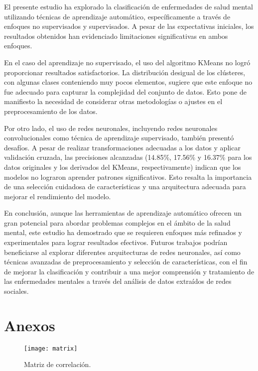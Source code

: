 \documentclass[
10pt, %
a4paper, %
oneside, %
headinclude,footinclude, %
BCOR5mm, %
]{scrartcl}
\begin{document}
El presente estudio ha explorado la clasificación de enfermedades de salud mental utilizando técnicas de aprendizaje automático, específicamente a través de enfoques no supervisados y supervisados. 
A pesar de las expectativas iniciales, los resultados obtenidos han evidenciado limitaciones significativas en ambos enfoques.

En el caso del aprendizaje no supervisado, el uso del algoritmo KMeans no logró proporcionar resultados satisfactorios. La distribución desigual de los clústeres, con algunas 
clases conteniendo muy pocos elementos, sugiere que este enfoque no fue adecuado para capturar la complejidad del conjunto de datos. Esto pone de manifiesto la necesidad de considerar otras 
metodologías o ajustes en el preprocesamiento de los datos.

Por otro lado, el uso de redes neuronales, incluyendo redes neuronales convolucionales como técnica de aprendizaje supervisado, también presentó desafíos. 
A pesar de realizar transformaciones adecuadas a los datos y aplicar validación cruzada, las precisiones alcanzadas (14.85\%, 17.56\% y 16.37\% para los datos originales y 
los derivados del KMeans, respectivamente) indican que los modelos no lograron aprender patrones significativos. Esto resalta la importancia de una selección cuidadosa de características y una 
arquitectura adecuada para mejorar el rendimiento del modelo.

En conclusión, aunque las herramientas de aprendizaje automático ofrecen un gran potencial para abordar problemas complejos en el ámbito de la salud mental, este estudio ha demostrado que se requieren enfoques más refinados 
y experimentales para lograr resultados efectivos. Futuros trabajos podrían beneficiarse al explorar diferentes arquitecturas de redes neuronales, así como técnicas avanzadas de preprocesamiento y selección de características, 
con el fin de mejorar la clasificación y contribuir a una mejor comprensión y tratamiento de las enfermedades mentales a través del análisis de datos extraídos de redes sociales.

\section{Anexos}


\begin{figure}[tb]
\centering 
\texttt{[image: matrix]} 
\caption[]{Matriz de correlación.} %
\label{fig:gallery} 
\end{figure}
\end{document}
